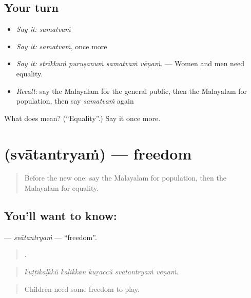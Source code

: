 \subsection*{Your turn}
\begin{itemize}
\raggedright
  \item \emph{Say it:} \emph{samatvaṁ}
  \item \emph{Say it:} \emph{samatvaṁ}, once more
  \item \emph{Say it:} \emph{strīkkuṁ puruṣanuṁ samatvaṁ vēṇaṁ.} — Women and men need equality.
  \item \emph{Recall:} say the Malayalam for the general public, then the Malayalam for population, then say \emph{samatvaṁ} again
\end{itemize}

\begin{tcolorbox}[breakable,colback=teal!4,colframe=teal!35!black,title={Before you move on}]
What does  mean? (\textquotedblleft{}Equality\textquotedblright{}.) Say it once more.
\end{tcolorbox}
\section[\texorpdfstring{\ml{സ്വാതന്ത്ര്യം} (svātantryaṁ)}{സ്വാതന്ത്ര്യം (svātantryaṁ)}]{ (svātantryaṁ) — freedom}

\label{lesson:ML-C415-svatantryam}



\begin{quote}
Before the new one: say the Malayalam for population, then the Malayalam for equality.
\end{quote}

\subsection*{You'll want to know: }
\textbf{} — \emph{svātantryaṁ} — \textquotedblleft{}freedom\textquotedblright{}.

\begin{quote}
    .
\end{quote}

\begin{quote}
\emph{kuṭṭikaḷkkŭ kaḷikkān kuṟaccŭ svātantryaṁ vēṇaṁ.}
\end{quote}

\begin{quote}
Children need some freedom to play.
\end{quote}

